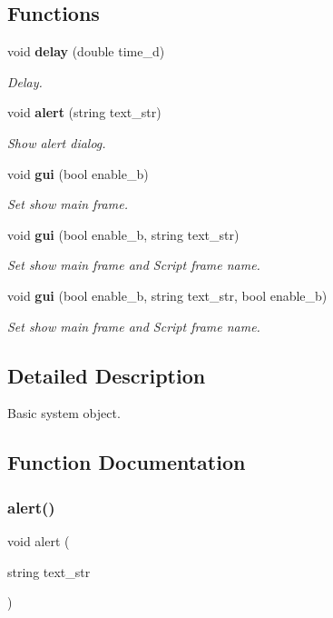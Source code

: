 \subsection*{Functions}
\begin{DoxyCompactItemize}
\item 
void \textbf{ delay} (double time\+\_\+d)
\begin{DoxyCompactList}\small\item\em Delay. \end{DoxyCompactList}\item 
void \textbf{ alert} (string text\+\_\+str)
\begin{DoxyCompactList}\small\item\em Show alert dialog. \end{DoxyCompactList}\item 
void \textbf{ gui} (bool enable\+\_\+b)
\begin{DoxyCompactList}\small\item\em Set show main frame. \end{DoxyCompactList}\item 
void \textbf{ gui} (bool enable\+\_\+b, string text\+\_\+str)
\begin{DoxyCompactList}\small\item\em Set show main frame and Script frame name. \end{DoxyCompactList}\item 
void \textbf{ gui} (bool enable\+\_\+b, string text\+\_\+str, bool enable\+\_\+b)
\begin{DoxyCompactList}\small\item\em Set show main frame and Script frame name. \end{DoxyCompactList}\end{DoxyCompactItemize}


\subsection{Detailed Description}
Basic system object. 



\subsection{Function Documentation}
\mbox{\label{group___system__object_gaecd05d8f4308bf9fe4cb37b5ba616767}} 
\subsubsection{alert()}
{\footnotesize\ttfamily void alert (\begin{DoxyParamCaption}\item[{string}]{text\+\_\+str }\end{DoxyParamCaption})}




